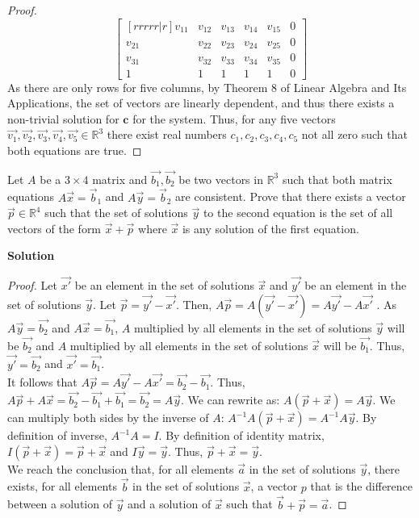\documentclass[11pt]{scrartcl}
\theoremstyle{dotlessP}
\theoremstyle{dotlessN}
\newcommand{\reals}{\mathbb{R}} %
\begin{document}
\begin{proof}
\[\begin{bmatrix}[rrrrr|r]
		v_{11} & v_{12} & v_{13} & v_{14} & v_{15} & 0 \\
		v_{21} & v_{22} & v_{23} & v_{24} & v_{25} & 0 \\
		v_{31} & v_{32} & v_{33} & v_{34} & v_{35} & 0 \\
		1  & 1 & 1 & 1 & 1 & 0
	\end{bmatrix}
	\] 
	As there are only rows for five columns, by Theorem 8 of Linear Algebra and Its Applications, the set of vectors are linearly dependent, and thus there exists a non-trivial solution for $\bm{c}$ for the system. Thus, for any five vectors $\Vec{v_1}, \Vec{v_2}, \Vec{v_3}, \Vec{v_4}, \Vec{v_5} \in \reals^3$ there exist real numbers $c_1, c_2, c_3, c_4, c_5$ not all zero such that both equations are true.
\end{proof}
\begin{ques}
	Let $A$ be a $3 \times 4$ matrix and $\vec{b_1}, \vec{b_2}$ be two vectors in $\mathbb{R}^3$ such that both matrix equations $A\Vec{x} = \Vec{b}_1$ and $A\Vec{y}=\Vec{b}_2$ are consistent. Prove that there exists a vector $\Vec{p} \in \mathbb{R}^4$ such that the set of solutions $\Vec{y}$ to the second equation is the set of all vectors of the form $\Vec{x} + \Vec{p}$ where $\Vec{x}$ is any solution of the first equation. 
\end{ques}
\textbf{Solution}
\begin{proof}
	Let $\Vec{x'}$ be an element in the set of solutions $\Vec{x}$ and $\Vec{y'}$ be an element in the set of solutions  $\Vec{y}$. Let  $\Vec{p} = \Vec{y'} - \Vec{x'}$. Then, $A\Vec{p} = A(\Vec{y'} - \Vec{x'}) = A\Vec{y'} - A\Vec{x'}$ . As $A\Vec{y} = \Vec{b_2}$ and $A\Vec{x} = \Vec{b_1}$, $A$ multiplied by all elements in the set of solutions $\Vec{y}$ will be $\Vec{b_2}$ and $A$ multiplied by all elements in the set of solutions $\Vec{x}$ will be $\Vec{b_1}$. Thus, $\Vec{y'} = \Vec{b_2}$ and $\Vec{x'} = \Vec{b_1}$. 
	\\

	It follows that $A\Vec{p} = A\Vec{y'} - A\Vec{x'} = \Vec{b_2} - \Vec{b_1}$. Thus, $A\Vec{p} + A\Vec{x} = \Vec{b_2} - \Vec{b_1} + \Vec{b_1} = \Vec{b_2} = A\Vec{y}$. We can rewrite as: $A(\Vec{p} + \Vec{x}) = A\Vec{y}$. We can multiply both sides by the inverse of  $A$:  $A^{-1}A(\Vec{p} + \Vec{x}) = A^{-1}A\Vec{y}$. By definition of inverse,  $A^{-1}A = I$. By definition of identity matrix, $I(\Vec{p} + \Vec{x}) = \Vec{p} + \Vec{x}$ and  $I\Vec{y} = \Vec{y}$. Thus,  $\Vec{p} + \Vec{x} = \Vec{y}$. 
	\\

	We reach the conclusion that, for all elements $\Vec{a}$ in the set of solutions $\Vec{y}$, there exists, for all elements $\Vec{b}$ in the set of solutions $\Vec{x}$, a vector $p$ that is the difference between a solution of $\Vec{y}$ and a solution of $\Vec{x}$ such that  $\Vec{b} + \Vec{p} = \Vec{a}$.
\end{proof}
\end{document}
